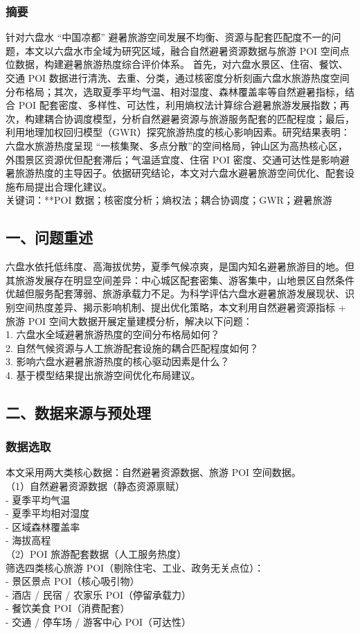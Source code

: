 \subsubsection*{摘要}
针对六盘水 “中国凉都” 避暑旅游空间发展不均衡、资源与配套匹配度不一的问题，本文以六盘水市全域为研究区域，融合自然避暑资源数据与旅游 POI 空间点位数据，构建避暑旅游热度综合评价体系。
首先，对六盘水景区、住宿、餐饮、交通 POI 数据进行清洗、去重、分类，通过核密度分析刻画六盘水旅游热度空间分布格局；其次，选取夏季平均气温、相对湿度、森林覆盖率等自然避暑指标，结合 POI 配套密度、多样性、可达性，利用熵权法计算综合避暑旅游发展指数；再次，构建耦合协调度模型，分析自然避暑资源与旅游服务配套的匹配程度；最后，利用地理加权回归模型（GWR）探究旅游热度的核心影响因素。研究结果表明：六盘水旅游热度呈现 “一核集聚、多点分散”的空间格局，钟山区为高热核心区，外围景区资源优但配套滞后；气温适宜度、住宿 POI 密度、交通可达性是影响避暑旅游热度的主导因子。依据研究结论，本文对六盘水避暑旅游空间优化、配套设施布局提出合理化建议。 \\
关键词：**POI 数据；核密度分析；熵权法；耦合协调度；GWR；避暑旅游

\subsection*{一、问题重述}
六盘水依托低纬度、高海拔优势，夏季气候凉爽，是国内知名避暑旅游目的地。但其旅游发展存在明显空间差异：中心城区配套密集、游客集中，山地景区自然条件优越但服务配套薄弱、旅游承载力不足。为科学评估六盘水避暑旅游发展现状、识别空间热度差异、揭示影响机制、提出优化策略，本文利用自然避暑资源指标 + 旅游 POI 空间大数据开展定量建模分析，解决以下问题：\\
1. 六盘水全域避暑旅游热度的空间分布格局如何？ \\
2. 自然气候资源与人工旅游配套设施的耦合匹配程度如何？ \\
3. 影响六盘水避暑旅游热度的核心驱动因素是什么？ \\
4. 基于模型结果提出旅游空间优化布局建议。

\subsection*{二、数据来源与预处理}
\subsubsection*{数据选取}
本文采用两大类核心数据：自然避暑资源数据、旅游 POI 空间数据。 \\
（1）自然避暑资源数据（静态资源禀赋）\\
- 夏季平均气温 \\
- 夏季平均相对湿度 \\
- 区域森林覆盖率  \\
- 海拔高程  \\
（2）POI 旅游配套数据（人工服务热度）\\
筛选四类核心旅游 POI（剔除住宅、工业、政务无关点位）：\\
- 景区景点 POI（核心吸引物） \\
- 酒店 / 民宿 / 农家乐 POI（停留承载力） \\
- 餐饮美食 POI（消费配套） \\
- 交通 / 停车场 / 游客中心 POI（可达性） \\
